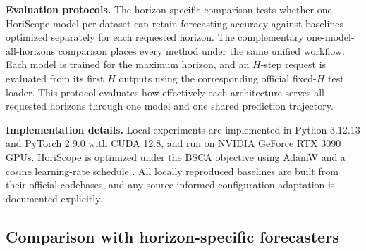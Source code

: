 \documentclass[final,3p,times]{elsarticle}
\begin{document}
\textbf{Evaluation protocols.} The horizon-specific comparison tests whether one HoriScope model per dataset can retain forecasting accuracy against baselines optimized separately for each requested horizon. The complementary one-model-all-horizons comparison places every method under the same unified workflow. Each model is trained for the maximum horizon, and an $H$-step request is evaluated from its first $H$ outputs using the corresponding official fixed-$H$ test loader. This protocol evaluates how effectively each architecture serves all requested horizons through one model and one shared prediction trajectory.

\textbf{Implementation details.} Local experiments are implemented in Python 3.12.13 and PyTorch 2.9.0 with CUDA 12.8, and run on NVIDIA GeForce RTX 3090 GPUs. HoriScope is optimized under the BSCA objective using AdamW and a cosine learning-rate schedule \citep{loshchilov2019adamw,loshchilov2017sgdr}. All locally reproduced baselines are built from their official codebases, and any source-informed configuration adaptation is documented explicitly.

\subsection{Comparison with horizon-specific forecasters}
\label{sec:horizon-specific-comparison}
\end{document}

